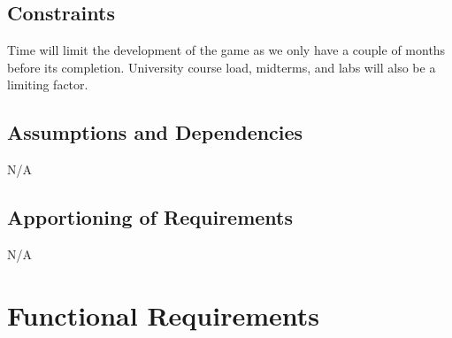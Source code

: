 \documentclass[12pt, titlepage]{article}
\begin{document}
  \subsection{Constraints}
  Time will limit the development of the game as we only have a couple of months before its completion. University course load, midterms, and labs will also be a limiting factor.
  \subsection{Assumptions and Dependencies}
  N/A
  \subsection{Apportioning of Requirements}
  N/A

\section{Functional Requirements}
\end{document}
